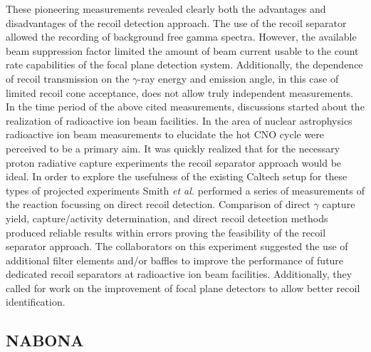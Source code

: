 These pioneering measurements revealed clearly both the advantages and disadvantages of the recoil detection approach. The use of the recoil separator allowed the recording of background free gamma spectra. However, the available beam suppression factor limited the amount of beam current usable to the count rate capabilities of the focal plane detection system. Additionally, the dependence of recoil transmission on the $\gamma$-ray energy and emission angle, in this case of limited recoil cone acceptance, does not allow truly independent measurements. In the time period of the above cited measurements, discussions started about the realization of radioactive ion beam facilities. In the area of nuclear astrophysics radioactive ion beam measurements to elucidate the hot CNO cycle were perceived to be a primary aim. It was quickly realized that for the necessary proton radiative capture experiments the recoil separator approach would be ideal. In order to explore the usefulness of the existing Caltech setup for these types of projected experiments Smith {\it et al.} \cite{smit91} performed a series of measurements of the  reaction focussing on direct  recoil detection. Comparison of direct $\gamma$ capture yield,  capture/activity determination, and  direct recoil detection methods produced reliable results within errors proving the feasibility of the recoil separator approach. The collaborators on this experiment suggested the use of additional filter elements and/or baffles to improve the performance of future dedicated recoil separators at radioactive ion beam facilities. Additionally, they called for work on the improvement of focal plane detectors to allow better recoil identification.


\subsection{NABONA}


